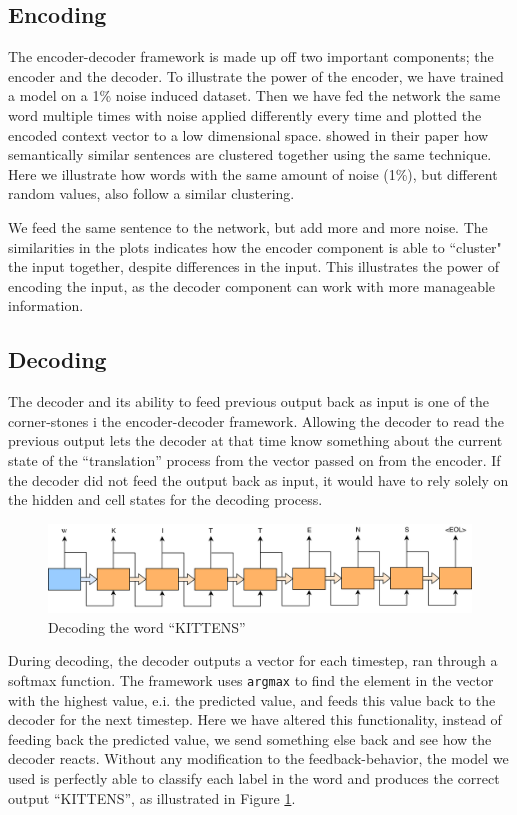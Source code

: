 \subsection{Encoding}
The encoder-decoder framework is made up off two important components; the encoder and the decoder. To illustrate the power of the encoder, we have trained a model on a 1\% noise induced dataset. Then we have fed the network the same word multiple times with noise applied differently every time and plotted the encoded context vector to a low dimensional space. \cite{sutskever2014sequence} showed in their paper how semantically similar sentences are clustered together using the same technique. Here we illustrate how words with the same amount of noise (1\%), but different random values, also follow a similar clustering.

We feed the same sentence to the network, but add more and more noise. The similarities in the plots indicates how the encoder component is able to ``cluster" the input together, despite differences in the input. This illustrates the power of encoding the input, as the decoder component can work with more manageable information.

\subsection{Decoding}
The decoder and its ability to feed previous output back as input is one of the corner-stones i the encoder-decoder framework. Allowing the decoder to read the previous output lets the decoder at that time know something about the current state of the ``translation'' process from the vector passed on from the encoder. If the decoder did not feed the output back as input, it would have to rely solely on the hidden and cell states for the decoding process.

\begin{figure}[!ht]
    \centering
    \includegraphics[width=1\textwidth]{fig/results/kittens_correct.png}
    \caption{Decoding the word ``KITTENS''}
    \label{fig:kittens_correct}
\end{figure}

During decoding, the decoder outputs a vector for each timestep, ran through a softmax function. The framework uses {\tt argmax} to find the element in the vector with the highest value, e.i. the predicted value, and feeds this value back to the decoder for the next timestep. Here we have altered this functionality, instead of feeding back the predicted value, we send something else back and see how the decoder reacts. Without any modification to the feedback-behavior, the model we used is perfectly able to classify each label in the word and produces the correct output ``KITTENS'', as illustrated in Figure \ref{fig:kittens_correct}. 


